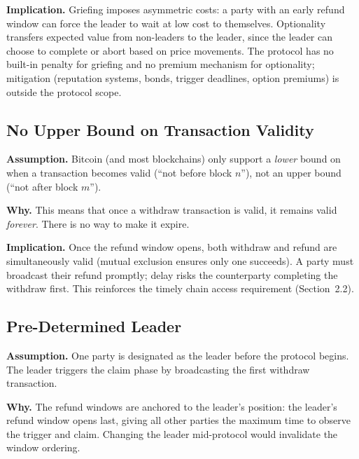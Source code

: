 \documentclass[11pt,a4paper]{article}
\begin{document}
\textbf{Implication.}\;
Griefing imposes asymmetric costs: a party with an early refund window can
force the leader to wait at low cost to themselves.
Optionality transfers expected value from non-leaders to the leader, since
the leader can choose to complete or abort based on price movements.
The protocol has no built-in penalty for griefing and no premium mechanism
for optionality; mitigation (reputation systems, bonds, trigger deadlines,
option premiums) is outside the protocol scope.

\subsection{No Upper Bound on Transaction Validity}

\textbf{Assumption.}\;
Bitcoin (and most blockchains) only support a \emph{lower} bound on when a
transaction becomes valid (``not before block $n$''), not an upper bound
(``not after block $m$'').

\textbf{Why.}\;
This means that once a withdraw transaction is valid, it remains valid
\emph{forever}.
There is no way to make it expire.

\textbf{Implication.}\;
Once the refund window opens, both withdraw and refund are simultaneously
valid (mutual exclusion ensures only one succeeds).
A party must broadcast their refund promptly; delay risks the counterparty
completing the withdraw first.
This reinforces the timely chain access requirement (Section~2.2).

\subsection{Pre-Determined Leader}

\textbf{Assumption.}\;
One party is designated as the leader before the protocol begins.
The leader triggers the claim phase by broadcasting the first withdraw
transaction.

\textbf{Why.}\;
The refund windows are anchored to the leader's position: the leader's
refund window opens last, giving all other parties the maximum time to
observe the trigger and claim.
Changing the leader mid-protocol would invalidate the window ordering.
\end{document}
